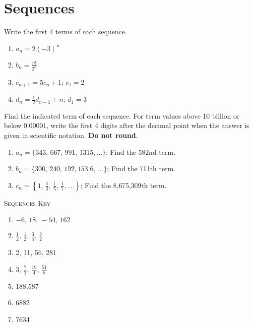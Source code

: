 \chapter{Sequences}

Write the first 4 terms of each sequence.
\begin{enumerate}
	\item $a_n = 2(-3)^n$
	\item $b_n = \frac{n!}{2^n}$
	\item $c_{n+1} = 5c_n + 1; \, c_1 = 2$
	\item $d_{n} = \frac{1}{2}d_{n-1} + n; \, d_1 = 3$
\end{enumerate}	\setcounter{Review}{\value{enumi}}

Find the indicated term of each sequence. For term values above 10 billion or below 0.00001, write the first 4 digits after the decimal point when the answer is given in scientific notation. \textbf{Do not round}.
\begin{enumerate}   \setcounter{enumi}{\value{Review}}
    \item $a_n = \{343, \, 667, \, 991, \, 1315, \dots\}$; Find the 582nd term.
    \item $b_n = \{300, \, 240, \, 192, 153.6, \, \dots\}$; Find the 711th term.
    \item $c_n = \left\{ 1, \, \frac{1}{3}, \, \frac{1}{5}, \, \frac{1}{7}, \, \dots\right\}$; Find the 8,675,309th term.
    \end{enumerate}
    \setcounter{Review}{\value{enumi}}

\newpage

\textsc{Sequences Key}

\begin{enumerate}
	\item $-6, \, 18, \, -54, \, 162$
    \item $\frac{1}{2}, \, \frac{1}{2}, \, \frac{3}{4}, \, \frac{3}{2}$
    \item 2, 11, 56, 281
    \item $3, \, \frac{7}{2}, \, \frac{19}{4}, \, \frac{51}{8}$
    \item 188,587
    \item 6882
    \item 7634
\end{enumerate}